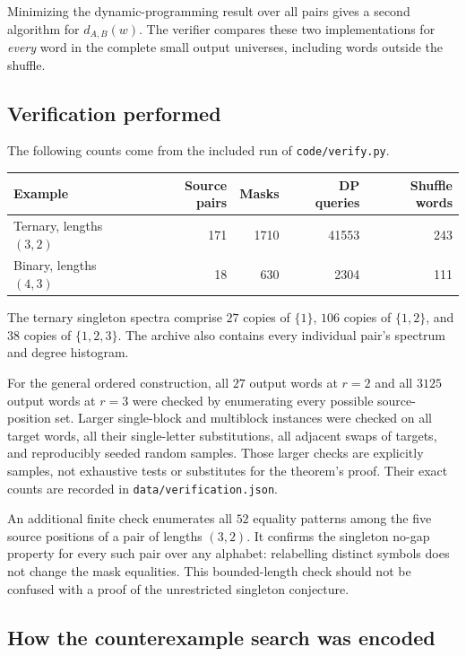 \documentclass[11pt,letterpaper]{article}
\theoremstyle{definition}\newtheorem{definition}[theorem]{Definition}
\theoremstyle{remark}\newtheorem{remark}[theorem]{Remark}
\theoremstyle{definition}\newtheorem{question}[theorem]{Question}
\begin{document}
Minimizing the dynamic-programming result over all pairs gives a second algorithm for $d_{A,B}(w)$. The verifier compares these two implementations for \emph{every} word in the complete small output universes, including words outside the shuffle.

\subsection{Verification performed}

The following counts come from the included run of \texttt{code/verify.py}.
\begin{center}
\begin{tabular}{lrrrr}
\toprule
Example & Source pairs & Masks & DP queries & Shuffle words\\
\midrule
Ternary, lengths $(3,2)$ & 171 & 1710 & 41553 & 243\\
Binary, lengths $(4,3)$ & 18 & 630 & 2304 & 111\\
\bottomrule
\end{tabular}
\end{center}
The ternary singleton spectra comprise $27$ copies of $\{1\}$, $106$ copies of $\{1,2\}$, and $38$ copies of $\{1,2,3\}$. The archive also contains every individual pair's spectrum and degree histogram.

For the general ordered construction, all $27$ output words at $r=2$ and all $3125$ output words at $r=3$ were checked by enumerating every possible source-position set. Larger single-block and multiblock instances were checked on all target words, all their single-letter substitutions, all adjacent swaps of targets, and reproducibly seeded random samples. Those larger checks are explicitly samples, not exhaustive tests or substitutes for the theorem's proof. Their exact counts are recorded in \texttt{data/verification.json}.

An additional finite check enumerates all $52$ equality patterns among the five source positions of a pair of lengths $(3,2)$. It confirms the singleton no-gap property for every such pair over any alphabet: relabelling distinct symbols does not change the mask equalities. This bounded-length check should not be confused with a proof of the unrestricted singleton conjecture.

\subsection{How the counterexample search was encoded}
\end{document}
